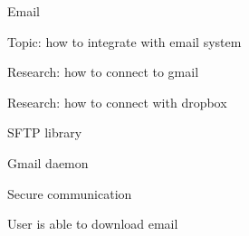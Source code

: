 \documentclass[onecolumn, draftclsnofoot,10pt, compsoc]{IEEEtran}
\begin{document}
    Email 

        Topic: how to integrate with email system 

        Research: how to connect to gmail 

        Research: how to connect with dropbox 

            SFTP library 

        Gmail daemon  

        Secure communication 

        User is able to download email 

\end{document}
